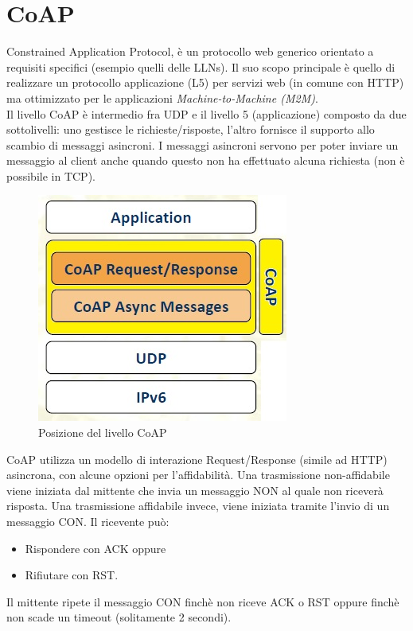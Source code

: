 \documentclass{article}
\begin{document}
\section{CoAP}
Constrained Application Protocol, è un protocollo web generico orientato a requisiti specifici (esempio quelli delle LLNs). Il suo scopo principale è quello di realizzare un protocollo applicazione (L5) per servizi web (in comune con HTTP) ma ottimizzato per le applicazioni \textit{Machine-to-Machine (M2M)}.\\
Il livello CoAP è intermedio fra UDP e il livello 5 (applicazione) composto da due sottolivelli: uno gestisce le richieste/risposte, l'altro fornisce il supporto allo scambio di messaggi asincroni. I messaggi asincroni servono per poter inviare un messaggio al client anche quando questo non ha effettuato alcuna richiesta (non è possibile in TCP).\\
\begin{figure}[H]
\centering
\includegraphics[scale=0.4]{figures/coaplayer.jpg}
\caption{Posizione del livello CoAP}
\end{figure}
CoAP utilizza un modello di interazione Request/Response (simile ad HTTP) asincrona, con alcune opzioni per l'affidabilità. Una trasmissione non-affidabile viene iniziata dal mittente che invia un messaggio NON al quale non riceverà risposta. Una trasmissione affidabile invece, viene iniziata tramite l'invio di un messaggio CON. Il ricevente può:
\begin{itemize}
    \item Rispondere con ACK oppure
    \item Rifiutare con RST.
\end{itemize}
Il mittente ripete il messaggio CON finchè non riceve ACK o RST oppure finchè non scade un timeout (solitamente 2 secondi).
\end{document}
